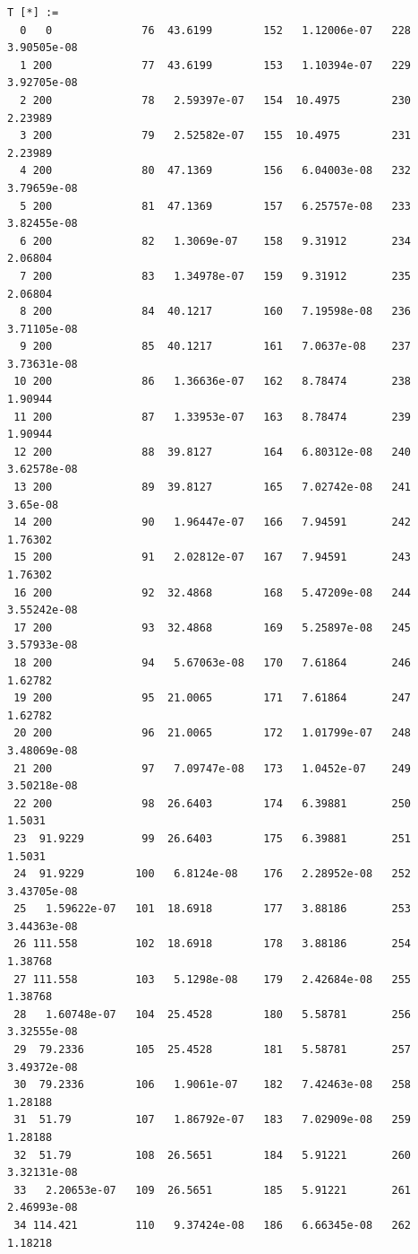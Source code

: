 \documentclass{article}
\begin{document}
\begin{verbatim}
T [*] :=
  0   0              76  43.6199        152   1.12006e-07   228   3.90505e-08
  1 200              77  43.6199        153   1.10394e-07   229   3.92705e-08
  2 200              78   2.59397e-07   154  10.4975        230   2.23989
  3 200              79   2.52582e-07   155  10.4975        231   2.23989
  4 200              80  47.1369        156   6.04003e-08   232   3.79659e-08
  5 200              81  47.1369        157   6.25757e-08   233   3.82455e-08
  6 200              82   1.3069e-07    158   9.31912       234   2.06804
  7 200              83   1.34978e-07   159   9.31912       235   2.06804
  8 200              84  40.1217        160   7.19598e-08   236   3.71105e-08
  9 200              85  40.1217        161   7.0637e-08    237   3.73631e-08
 10 200              86   1.36636e-07   162   8.78474       238   1.90944
 11 200              87   1.33953e-07   163   8.78474       239   1.90944
 12 200              88  39.8127        164   6.80312e-08   240   3.62578e-08
 13 200              89  39.8127        165   7.02742e-08   241   3.65e-08
 14 200              90   1.96447e-07   166   7.94591       242   1.76302
 15 200              91   2.02812e-07   167   7.94591       243   1.76302
 16 200              92  32.4868        168   5.47209e-08   244   3.55242e-08
 17 200              93  32.4868        169   5.25897e-08   245   3.57933e-08
 18 200              94   5.67063e-08   170   7.61864       246   1.62782
 19 200              95  21.0065        171   7.61864       247   1.62782
 20 200              96  21.0065        172   1.01799e-07   248   3.48069e-08
 21 200              97   7.09747e-08   173   1.0452e-07    249   3.50218e-08
 22 200              98  26.6403        174   6.39881       250   1.5031
 23  91.9229         99  26.6403        175   6.39881       251   1.5031
 24  91.9229        100   6.8124e-08    176   2.28952e-08   252   3.43705e-08
 25   1.59622e-07   101  18.6918        177   3.88186       253   3.44363e-08
 26 111.558         102  18.6918        178   3.88186       254   1.38768
 27 111.558         103   5.1298e-08    179   2.42684e-08   255   1.38768
 28   1.60748e-07   104  25.4528        180   5.58781       256   3.32555e-08
 29  79.2336        105  25.4528        181   5.58781       257   3.49372e-08
 30  79.2336        106   1.9061e-07    182   7.42463e-08   258   1.28188
 31  51.79          107   1.86792e-07   183   7.02909e-08   259   1.28188
 32  51.79          108  26.5651        184   5.91221       260   3.32131e-08
 33   2.20653e-07   109  26.5651        185   5.91221       261   2.46993e-08
 34 114.421         110   9.37424e-08   186   6.66345e-08   262   1.18218

\end{verbatim}
\end{document}
